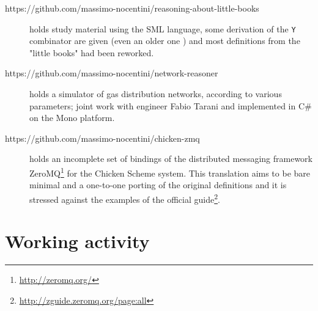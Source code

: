 \documentclass[a4paper]{tufte-handout}
\begin{document}
\begin{description}
        \item[https://github.com/massimo-nocentini/reasoning-about-little-books]
        holds study material using the SML language, some derivation of the \verb|Y|
        combinator are given (even an older one ) and most definitions from
        the "little books" had been reworked.

        \item[https://github.com/massimo-nocentini/network-reasoner] holds a
        simulator of gas distribution networks, according to various
        parameters; joint work with engineer Fabio Tarani and implemented in
        C\# on the Mono platform.

        \item[https://github.com/massimo-nocentini/chicken-zmq] holds an
        incomplete set of bindings of the distributed messaging framework
        ZeroMQ\footnote{\url{http://zeromq.org/}} for the Chicken Scheme
        system. This translation aims to be bare minimal and a one-to-one
        porting of the original definitions and it is stressed against
        the examples of the official
        guide\footnote{\url{http://zguide.zeromq.org/page:all}}.

        
    \end{description}

    \section{Working activity}
\end{document}
